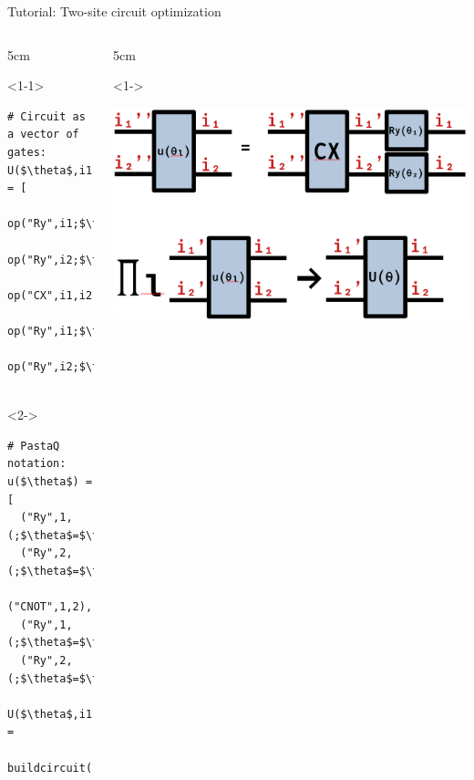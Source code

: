\begin{frame}[fragile]{Tutorial: Two-site circuit optimization}

\begin{columns}

\begin{column}{5cm}

\begin{onlyenv}<1-1>
\begin{lstlisting}[language=JuliaLocal, style=julia, mathescape, basicstyle=\scriptsize\ttfamily]
# Circuit as a vector of gates:
U($\theta$,i1,i2) = [
  op("Ry",i1;$\theta$=$\theta$[1]),
  op("Ry",i2;$\theta$=$\theta$[2]),
  op("CX",i1,i2),
  op("Ry",i1;$\theta$=$\theta$[3]),
  op("Ry",i2;$\theta$=$\theta$[4])]


 \end{lstlisting}
\end{onlyenv}

\begin{onlyenv}<2->
\begin{lstlisting}[language=JuliaLocal, style=julia, mathescape, basicstyle=\scriptsize\ttfamily]
# PastaQ notation:
u($\theta$) = [
  ("Ry",1,(;$\theta$=$\theta$[1])),
  ("Ry",2,(;$\theta$=$\theta$[2])),
  ("CNOT",1,2),
  ("Ry",1,(;$\theta$=$\theta$[3])),
  ("Ry",2,(;$\theta$=$\theta$[4]))]

U($\theta$,i1,i2) =
 buildcircuit([i1,i2],u($\theta$))
\end{lstlisting}
\end{onlyenv}

\end{column}

\begin{column}{5cm}

\begin{onlyenv}<1->
\vspace*{0.0cm}
\begin{center}
\includegraphics[width=1.0\textwidth]{
  slides/assets/U12.png
}
\end{center}
\vspace*{0.0cm}
\end{onlyenv}

\end{column}

\end{columns}

\end{frame}
